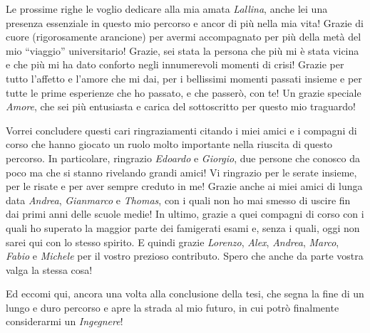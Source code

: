 \begin{acknowledgements}
  Le prossime righe le voglio dedicare alla mia amata \emph{Lallina}, anche lei una presenza essenziale in questo mio percorso e ancor di più nella mia vita! Grazie di cuore (rigorosamente arancione) per avermi accompagnato per più della metà del mio ``viaggio'' universitario! Grazie, sei stata la persona che più mi è stata vicina e che più mi ha dato conforto negli innumerevoli momenti di crisi! Grazie per tutto l'affetto e l'amore che mi dai, per i bellissimi momenti passati insieme e per tutte le prime esperienze che ho passato, e che passerò, con te! Un grazie speciale \emph{Amore}, che sei più entusiasta e carica del sottoscritto per questo mio traguardo!

  Vorrei concludere questi cari ringraziamenti citando i miei amici e i compagni di corso che hanno giocato un ruolo molto importante nella riuscita di questo percorso.
  In particolare, ringrazio \emph{Edoardo} e \emph{Giorgio}, due persone che conosco da poco ma che si stanno rivelando grandi amici! Vi ringrazio per le serate insieme, per le risate e per aver sempre creduto in me! Grazie anche ai miei amici di lunga data \emph{Andrea}, \emph{Gianmarco} e \emph{Thomas}, con i quali non ho mai smesso di uscire fin dai primi anni delle scuole medie! In ultimo, grazie a quei compagni di corso con i quali ho superato la maggior parte dei famigerati esami e, senza i quali, oggi non sarei qui con lo stesso spirito. E quindi grazie \emph{Lorenzo}, \emph{Alex}, \emph{Andrea}, \emph{Marco}, \emph{Fabio} e \emph{Michele} per il vostro prezioso contributo. Spero che anche da parte vostra valga la stessa cosa!

  Ed eccomi qui, ancora una volta alla conclusione della tesi, che segna la fine di un lungo e duro percorso e apre la strada al mio futuro, in cui potrò finalmente considerarmi un \textit{Ingegnere}!
\end{acknowledgements}